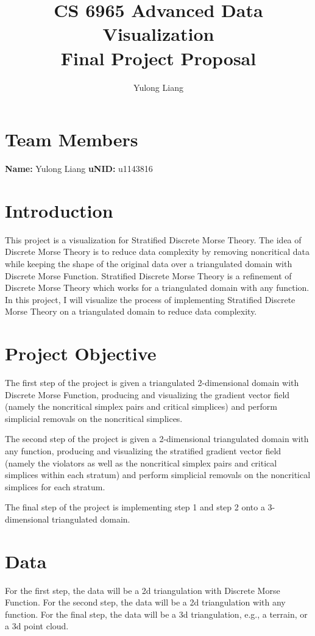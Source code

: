 \documentclass[12pt]{article}
\begin{document}
\title{CS 6965 Advanced Data Visualization\\{\bf Final Project Proposal}}
\author{Yulong Liang}
\maketitle

\section{Team Members}
\textbf{Name: } Yulong Liang	 \hspace{2ex} \textbf{uNID: } u1143816

\section{Introduction}
This project is a visualization for Stratified Discrete Morse Theory. 
The idea of Discrete Morse Theory is to reduce data complexity by removing noncritical data while keeping the shape of the original data over a triangulated domain with Discrete Morse Function. Stratified Discrete Morse Theory is a refinement of Discrete Morse Theory which works for a triangulated domain with any function.
In this project, I will visualize the process of implementing Stratified Discrete Morse Theory on a triangulated domain to reduce data complexity.

\section{Project Objective}
The first step of the project is given a triangulated 2-dimensional domain with Discrete Morse Function, producing and visualizing the gradient vector field (namely the noncritical simplex pairs and critical simplices) and perform simplicial removals on the noncritical simplices. 

The second step of the project is given a 2-dimensional triangulated domain with any function, producing and visualizing the stratified gradient vector field (namely the violators as well as the noncritical simplex pairs and critical simplices within each stratum) and perform simplicial removals on the noncritical simplices for each stratum.

The final step of the project is implementing step 1 and step 2 onto a 3-dimensional triangulated domain.

\section{Data}
For the first step, the data will be a 2d triangulation with Discrete Morse Function. For the second step, the data will be a 2d triangulation with any function. For the final step, the data will be a 3d triangulation, e.g., a terrain, or a 3d point cloud.
\end{document}
